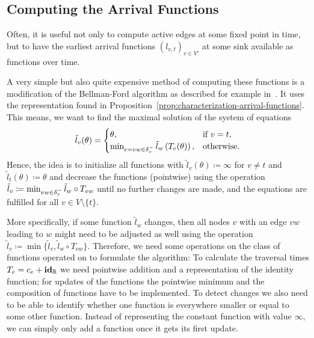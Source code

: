 \subsection{Computing the Arrival Functions}

Often, it is useful not only to compute active edges at some fixed point in time, but to have the earliest arrival functions $(l_{v,t})_{v\in V'}$ at some sink available as functions over time.

A very simple but also quite expensive method of computing these functions is a modification of the Bellman-Ford algorithm as described for example in~\cite{TimeDepShortestPaths}.
It uses the representation found in Proposition~\ref{prop:characterization-arrival-functions}.
This means, we want to find the maximal solution of the system of equations \[
    \tilde l_v(\theta) = \begin{cases}
        \theta, &\text{if $v = t$}, \\
        \min_{\substack{
            e=vw\in\delta^-_{v}               
        }} \tilde{l}_w\left(
            T_e(\theta)
        \right), &\text{otherwise}.
    \end{cases}
\]
Hence, the idea is to initialize all functions with $\tilde l_v(\theta) \coloneqq \infty$ for $v\neq t$ and $\tilde l_t(\theta) \coloneqq \theta$ and decrease the functions (pointwise) using the operation $\tilde l_v \coloneqq \min_{vw\in\delta^-_{v}} \tilde l_w \circ T_{vw}$ until no further changes are made, and the equations are fulfilled for all $v\in V\setminus\{t\}$.

More specifically, if some function $\tilde l_w$ changes, then all nodes $v$ with an edge $vw$ leading to $w$ might need to be adjusted as well using the operation $\tilde l_v \coloneqq \min\{ \tilde l_v, \tilde l_w \circ T_{vw} \}$.
Therefore, we need some operations on the class of functions operated on to formulate the algorithm:
To calculate the traversal times $T_e = c_e + \mathbf{id}_{\mathbb{R}}$ we need pointwise addition and a representation of the identity function; for updates of the functions the pointwise minimum and the composition of functions have to be implemented.
To detect changes we also need to be able to identify whether one function is everywhere smaller or equal to some other function. 
Instead of representing the constant function with value $\infty$, we can simply only add a function once it gets its first update.


